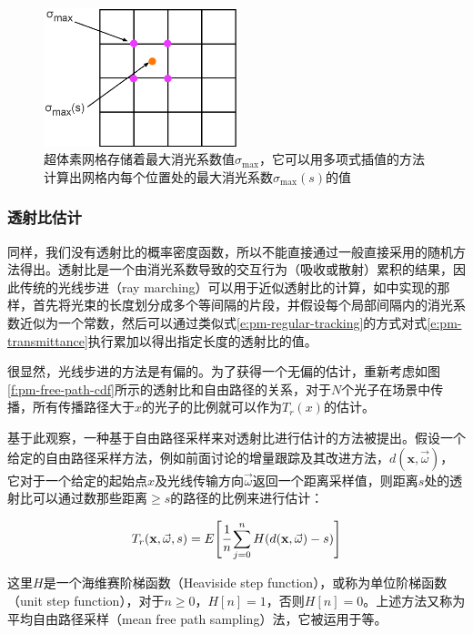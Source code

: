 \begin{figure}
	\sidecaption
	\includegraphics[width=0.5\textwidth]{figures/pm/super-voxels}
	\caption{超体素网格存储着最大消光系数值$\sigma_{\max}$，它可以用多项式插值的方法计算出网格内每个位置处的最大消光系数$\sigma_{\max}(s)$的值}
	\label{f:pm-super-voxels}
\end{figure}





\subsubsection{透射比估计}
同样，我们没有透射比的概率密度函数，所以不能直接通过一般直接采用的随机方法得出。透射比是一个由消光系数导致的交互行为（吸收或散射）累积的结果，因此传统的光线步进（ray marching）可以用于近似透射比的计算，如\cite{a:AComprehensiveTheoryofVolumetricRadianceEstimationusingPhotonPointsandBeams}中实现的那样，首先将光束的长度划分成多个等间隔的片段，并假设每个局部间隔内的消光系数近似为一个常数，然后可以通过类似式\ref{e:pm-regular-tracking}的方式对式\ref{e:pm-transmittance}执行累加以得出指定长度的透射比的值。

很显然，光线步进的方法是有偏的。为了获得一个无偏的估计，重新考虑如图\ref{f:pm-free-path-cdf}所示的透射比和自由路径的关系，对于$N$个光子在场景中传播，所有传播路径大于$x$的光子的比例就可以作为$T_r(x)$的估计。

基于此观察，一种基于自由路径采样来对透射比进行估计的方法被提出。假设一个给定的自由路径采样方法，例如前面讨论的增量跟踪及其改进方法，$d(\mathbf{x},\vec{\omega})$，它对于一个给定的起始点$x$及光线传输方向$\vec{\omega}$返回一个距离采样值，则距离$s$处的透射比可以通过数那些距离$\geq s$的路径的比例来进行估计：

\begin{equation}
	T_r(\mathbf{x},\vec{\omega},s)=E\Bigg[ \cfrac{1}{n}\sum^{n}_{j=0}H(d(\mathbf{x},\vec{\omega})-s)\Bigg]
\end{equation}

这里$H$是一个海维赛阶梯函数（Heaviside step function），或称为单位阶梯函数（unit step function），对于$n\geq 0$，$H[n]=1$，否则$H[n]=0$。上述方法又称为平均自由路径采样（mean free path sampling）法，它被运用于\cite{a:ProgressivePhotonBeams,a:FreePathSamplinginHighResolutionInhomogeneousParticipatingMedia}等。

